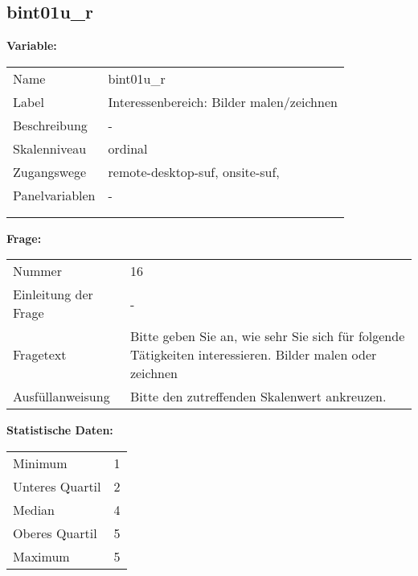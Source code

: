 	
	
	\subsection{bint01u\_r}
	\label{subSection:bint01u_r}

	\noindent\textbf{Variable:}\\
		\begin{tabular}{lL{11.3cm}}
			\label{tableVariable:bint01u_r}
			Name & bint01u\_r \\
			Label & Interessenbereich: Bilder malen/zeichnen \\
			Beschreibung & - \\
			Skalenniveau & ordinal \\
			Zugangswege &
				remote-desktop-suf,
				onsite-suf,
 \\
			Panelvariablen & -
			 \\
			 \\
 \\
		\end{tabular}

		\vspace*{1 cm}
		\noindent\textbf{Frage:}\\
		\begin{tabular}{lL{11.3cm}}
			\label{tableQuestion:bint01u_r}
			Nummer & 16 \\
			Einleitung der Frage & - \\
			Fragetext & Bitte geben Sie an, wie sehr Sie sich für folgende Tätigkeiten interessieren.
Bilder malen oder zeichnen \\
			Ausfüllanweisung & Bitte den zutreffenden Skalenwert ankreuzen. \\
		\end{tabular}


		\vspace*{1 cm}
		\noindent\textbf{Statistische Daten:}\\
			\begin{tabular}{ll}
				\label{tableStatistics:bint01u_r}
					Minimum & 1 \\
					Unteres Quartil & 2 \\
					Median & 4 \\
					Oberes Quartil & 5 \\
					Maximum & 5 \\
			\end{tabular}



